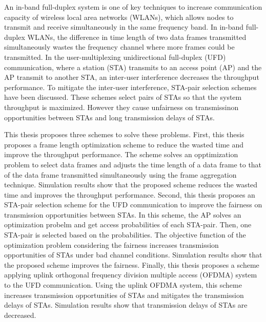 \documentclass[master]{kuisthesis}		%
\begin{document}
\begin{eabstract}				%
	An in-band full-duplex system is one of key techniques to increase communication capacity of wireless local area networks (WLANs), which allows nodes to transmit and receive simultaneously in the same frequency band. In in-band full-duplex WLANs, the difference in time length of two data frames transmitted simultaneously wastes the frequency channel where more frames could be transmitted. In the user-multiplexing unidirectional full-duplex (UFD) communication,  where a station (STA) transmits to an access point (AP) and the AP transmit to another STA, an inter-user interference decreases the throughput performance. To mitigate the inter-user interference, STA-pair selection schemes have been discussed.
	These schemes select pairs of STAs so that the system throughput is maximized.
	However they cause unfairness on transmissinon opportunities between STAs and long transmission delays of STAs.
	\par
	This thesis proposes three schemes to solve these problems. First, this thesis proposes a frame length optimization scheme to reduce the wasted time and improve the throughput performance. The scheme solves an opptimization problem to select data frames and adjusts the time length of a data frame to that of the data frame transmitted simultaneously using the frame aggregation technique. Simulation results show that the proposed scheme reduces the wasted time and improves the throughput performance. Second, this thesis proposes an STA-pair selection scheme for the UFD communication to improve the fairness on transmission opportunities between STAs. In this scheme, the AP solves an optimization probelm and get access probabilities of each STA-pair. Then, one STA-pair is selected based on the probabilities. The objective function of the optimization problem considering the fairness increases transmission opportunities of STAs under bad channel conditions.
	Simulation results show that the proposed scheme improves the fairness.
	Finally, this thesis proposes a scheme applying uplink orthogonal frequency division multiple access (OFDMA) system to the UFD communication.
	Using the uplink OFDMA system, this scheme increases transmission opportunities of STAs and mitigates the transmission delays of STAs.
	Simulation results show that transmission delays of STAs are decreased.
\end{eabstract}

\tableofcontents				%

\end{document}
